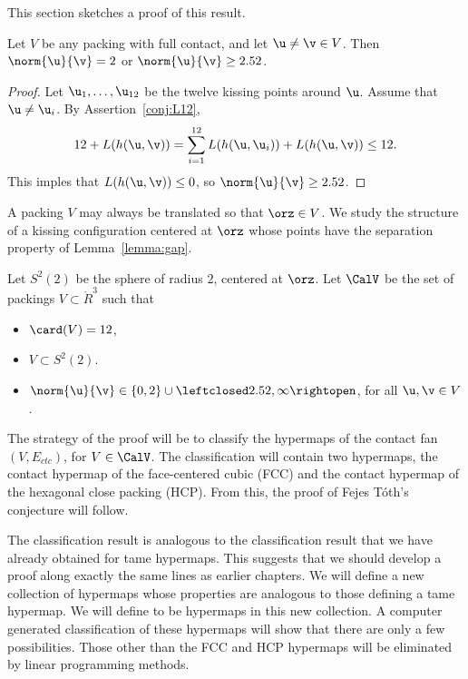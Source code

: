This section  sketches a proof of this result.  


\begin{lemma}[] \label{lemma:gap}
  Let $V$ be any packing with full contact, and let $\u\ne\v\in V$.
  Then $\norm{\u}{\v}=2$ or $\norm{\u}{\v} \ge 2.52$.
\end{lemma}
%
%

\begin{proof} Let $ \u_1,\ldots, \u_{12}$ be the twelve kissing points
  around $\u$.  Assume that $\u\ne \u_i$.  By
  Assertion~\ref{conj:L12},
\[
  12 + L(h( \u, \v)) 
  = \sum_{i=1}^{12} L(h( \u, \u_i)) + L(h( \u, \v)) \le 12.
\]
This imples that $L(h( \u, \v))\le 0$, so $\norm{ \u}{ \v}\ge 2.52$.
\end{proof}

A packing $V$ may always be translated so that $\orz\in V$.  We study
the structure of a kissing configuration centered at $\orz$ whose
points have the separation property of Lemma~\ref{lemma:gap}.

\begin{definition}[$S^2(2)$,~$\CalV$]
  Let $S^2(2)$ be the sphere of radius $2$, centered at $\orz$.  Let
  $\CalV$ be the set of packings $V\subset \ring{R}^3$ such that
\begin{itemize}
\item $\card(V) = 12$,
\item $V\subset S^2(2)$.
\item $\norm{\u}{\v} \in \{0,2\}\cup
  \leftclosed2.52,\infty\rightopen$, for all $\u,\v\in V$.
\end{itemize}
%
%
\end{definition}

The strategy of the proof will be to classify the hypermaps of the
contact fan $(V,E_{ctc})$, for $V\in \CalV$.  The classification will
contain two hypermaps, the contact hypermap of the face-centered cubic
(FCC) and the contact hypermap of the hexagonal close packing (HCP).
From this, the proof of Fejes T\'oth's conjecture will follow.

The classification result is analogous to the classification result
that we have already obtained for tame hypermaps.  This suggests that
we should develop a proof along exactly the same lines as earlier
chapters.  We will define a new collection of hypermaps whose
properties are analogous to those defining a tame hypermap.  We will
define  to be hypermaps in this
new collection.  A computer generated classification of these
hypermaps will show that there are only a few possibilities.  Those
other than the FCC and HCP hypermaps will be eliminated by linear
programming methods.

